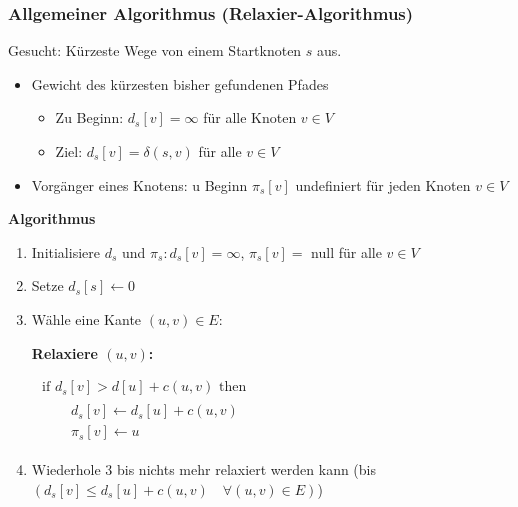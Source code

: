 \begin{sectionbox}
\subsubsection{Allgemeiner Algorithmus (Relaxier-Algorithmus)}\smallskip
Gesucht: Kürzeste Wege von einem Startknoten $s$ aus.
\begin{itemize}
    \item Gewicht des kürzesten bisher gefundenen Pfades
    \begin{itemize}
        \item Zu Beginn: $d_{s}[v]=\infty$ für alle Knoten $v \in V$
        \item Ziel: $d_{s}[v]=\delta(s, v)$ für alle $v \in V$
    \end{itemize}
    \item Vorgänger eines Knotens: u Beginn $\pi_{s}[v]$ undefiniert für jeden Knoten $v \in V$
\end{itemize}\smallskip


\textbf{Algorithmus}\smallskip
\begin{enumerate}
    \item Initialisiere $d_{s}$ und $\pi_{s}: d_{s}[v]=\infty$, $\pi_{s}[v]=$ null für alle $v \in V$
    \item Setze $d_{s}[s] \leftarrow 0$
    \item Wähle eine Kante $(u, v) \in E$:\par
    \begin{greenbox}
    \textbf{Relaxiere $(u, v)$:}\par
    $\begin{array}{l}
    \text { if } d_{s}[v]>d[u]+c(u, v) \text { then } \\
    \qquad \begin{array}{l}
    d_{s}[v] \leftarrow d_{s}[u]+c(u, v) \\
    \pi_{s}[v] \leftarrow u
    \end{array}
    \end{array}$
    \end{greenbox}
    \item Wiederhole 3 bis nichts mehr relaxiert werden kann (bis $\left(d_{s}[v] \leq d_{s}[u]+c(u, v) \quad \forall(u, v) \in E\right)$)
\end{enumerate}\vspace{10px}
\end{sectionbox}
\vspace{-4pt}
